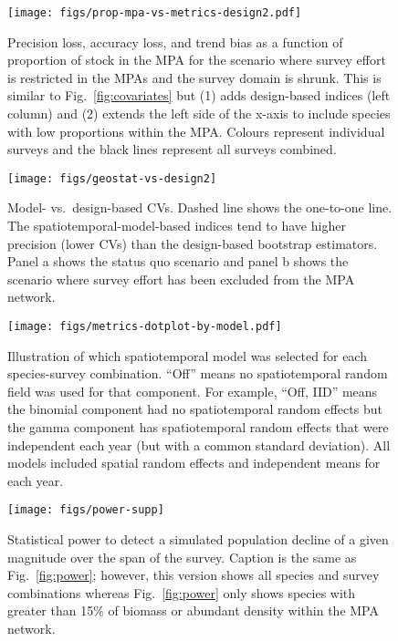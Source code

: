 \documentclass[12pt]{article}
\begin{document}

\begin{figure}[htb]
    \centering
    \texttt{[image: figs/prop-mpa-vs-metrics-design2.pdf]}
    \caption{Precision loss, accuracy loss, and trend bias as a function of proportion of stock in the MPA for the scenario where survey effort is restricted in the MPAs and the survey domain is shrunk. This is similar to Fig.~\ref{fig:covariates} but (1) adds design-based indices (left column) and (2) extends the left side of the x-axis to include species with low proportions within the MPA. Colours represent individual surveys and the black lines represent all surveys combined.}
    \label{fig:covariates-design}
\end{figure}

\clearpage

\begin{figure}[htb]
    \centering
    \texttt{[image: figs/geostat-vs-design2]}
    \caption{Model- vs.\ design-based CVs. Dashed line shows the one-to-one line. The spatiotemporal-model-based indices tend to have higher precision (lower CVs) than the design-based bootstrap estimators. Panel a shows the status quo scenario and panel b shows the scenario where survey effort has been excluded from the MPA network.}
    \label{fig:design-model-cv}
\end{figure}

\clearpage

\begin{figure}[htb]
    \centering
    \texttt{[image: figs/metrics-dotplot-by-model.pdf]}
    \caption{Illustration of which spatiotemporal model was selected for each species-survey combination. ``Off'' means no spatiotemporal random field was used for that component. For example, ``Off, IID'' means the binomial component had no spatiotemporal random effects but the gamma component has spatiotemporal random effects that were independent each year (but with a common standard deviation). All models included spatial random effects and independent means for each year.}
    \label{fig:metrics-by-model}
\end{figure}

\clearpage

\begin{figure}[htb]
    \centering
    \texttt{[image: figs/power-supp]}
    \caption{Statistical power to detect a simulated population decline of a given magnitude over the span of the survey. Caption is the same as Fig.~\ref{fig:power}; however, this version shows all species and survey combinations whereas Fig.~\ref{fig:power} only shows species with greater than 15\% of biomass or abundant density within the MPA network.}
    \label{fig:power-supp}
\end{figure}
\end{document}
